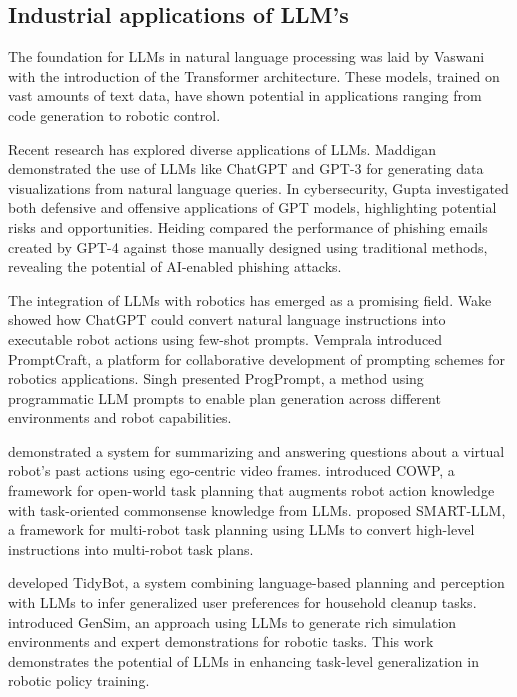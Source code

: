 \documentclass{ieeeaccess}
\begin{document}
\subsection{Industrial applications of LLM's}
The foundation for LLMs in natural language processing was laid by Vaswani \cite{DBLP:journals/corr/VaswaniSPUJGKP17} with the introduction of the Transformer architecture. These models, trained on vast amounts of text data, have shown potential in applications ranging from code generation to robotic control.

Recent research has explored diverse applications of LLMs. Maddigan \cite{10121440} demonstrated the use of LLMs like ChatGPT and GPT-3 for generating data visualizations from natural language queries. In cybersecurity, Gupta \cite{10198233} investigated both defensive and offensive applications of GPT models, highlighting potential risks and opportunities. Heiding \cite{10466545} compared the performance of phishing emails created by GPT-4 against those manually designed using traditional methods, revealing the potential of AI-enabled phishing attacks.


The integration of LLMs with robotics has emerged as a promising field. Wake \cite{10235949} showed how ChatGPT could convert natural language instructions into executable robot actions using few-shot prompts. Vemprala \cite{10500490} introduced PromptCraft, a platform for collaborative development of prompting schemes for robotics applications. Singh \cite{Singh2023} presented ProgPrompt, a method using programmatic LLM prompts to enable plan generation across different environments and robot capabilities.

\cite{DeChant2023} demonstrated a system for summarizing and answering questions about a virtual robot's past actions using ego-centric video frames. \cite{Ding2023} introduced COWP, a framework for open-world task planning that augments robot action knowledge with task-oriented commonsense knowledge from LLMs. \cite{kannan2024smartllmsmartmultiagentrobot} proposed SMART-LLM, a framework for multi-robot task planning using LLMs to convert high-level instructions into multi-robot task plans.

\cite{Wu2023} developed TidyBot, a system combining language-based planning and perception with LLMs to infer generalized user preferences for household cleanup tasks. \cite{wang2024gensimgeneratingroboticsimulation} introduced GenSim, an approach using LLMs to generate rich simulation environments and expert demonstrations for robotic tasks. This work demonstrates the potential of LLMs in enhancing task-level generalization in robotic policy training.
\end{document}
